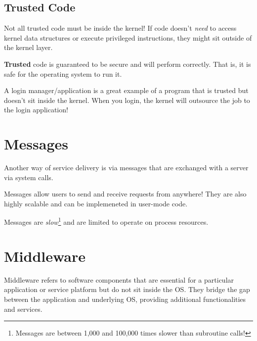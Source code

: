 \documentclass{report}
\begin{document}
\subsection{Trusted Code}
Not all trusted code must be inside the kernel! If code doesn't \textit{need} to access kernel data
structures or execute privileged instructions, they might sit outside of the kernel layer. 

\begin{tcolorbox}[title=Definition: Trust]
  \textbf{Trusted} code is guaranteed to be secure and will perform correctly. That is, it is safe
  for the operating system to run it.
\end{tcolorbox}


\begin{tcolorbox}[colback=blue!5!white,colframe=black!75!blue,title=Example: Lazy Login] 
  A login manager/application is a great example of a program that is trusted but doesn't sit inside
  the kernel. When you login, the kernel will outsource the job to the login application!
\end{tcolorbox}





\section{Messages}
Another way of service delivery is via messages that are exchanged with a server via system
calls.

\begin{tcbraster}[raster columns=2, raster equal height]
  \begin{tcolorbox}[colback=green!5!white,colframe=black!75!green,title=Advantages]
    Messages allow users to send and receive requests from anywhere! They are also highly scalable and
    can be implemeneted in user-mode code.
  \end{tcolorbox}
  \begin{tcolorbox}[colback=red!5!white,colframe=black!40!red,title=Disadvantages]
    Messages are \textit{slow}\footnote{Messages are between 1,000 and 100,000 times slower than
      subroutine calls!} and are limited to operate on process resources.
  \end{tcolorbox}
\end{tcbraster}





\section{Middleware}
Middleware refers to software components that are essential for a particular application or service
platform but do not sit inside the OS. They bridge the gap between the application and underlying
OS, providing additional functionalities and services.
\end{document}
